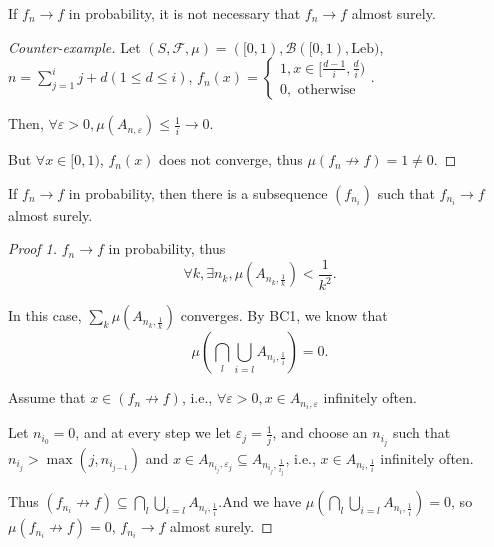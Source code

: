\begin{thm}{}{}
    If $f_n \to f$ in probability, it is not necessary that $f_n \to f$ almost surely.
\end{thm}
\begin{proof}[Counter-example]
    Let $(S, \mathcal F, \mu ) = ([0, 1), \mathcal B([0, 1), \text{Leb})$, $n = \sum _{j=1}^i j + d(1 \le d \le i)$,
    \begin{math}
        f_n(x) = \begin{cases}
            1, x \in [\frac{d-1}{i}, \frac{d}{i})\\
            0, \text{ otherwise }
        \end{cases}
    .\end{math}

    Then, $\forall \varepsilon >0, \mu (A_{n, \varepsilon }) \le \frac{1}{i} \to 0$. 

    But $\forall x \in [0, 1)$, $f_n(x)$ does not converge, thus $\mu (f_n \not\to f) = 1 \neq 0$.
\end{proof}

\begin{thm}{}{}
    If $f_n \to f$ in probability, then there is a subsequence $(f_{n_i})$ such that $f_{n_i} \to f$ almost surely.
\end{thm}

\begin{proof}[Proof 1]
    $f_n \to f$ in probability, thus
    $$\forall k, \exists n_k, \mu(A_{n_k, \frac{1}{k}}) < \frac{1}{k^2} .$$

    In this case, $\sum _k \mu(A_{n_k, \frac{1}{k}})$ converges. By BC1, we know that
    $$\mu(\bigcap_{l}\bigcup_{i=l} A_{n_i, \frac{1}{i}}) = 0.$$

    Assume that $x \in (f_n \not\to f)$, i.e., $\forall \varepsilon >0, x \in A_{n_i, \varepsilon }$ infinitely often. 

    Let $n_{i_0} = 0$, and at every step we let $\varepsilon _j = \frac{1}{j}$, and choose an $n_{i_j}$ such that $n_{i_j} > \max(j, n_{i_{j-1}})$ and $x \in A_{n_{i_j}, \varepsilon _j} \subseteq A_{n_{i_j}, \frac{1}{i_j}}$, i.e., $x \in A_{n_i, \frac{1}{i}}$ infinitely often.

    Thus $(f_{n_i} \not\to f) \subseteq \bigcap_{l}\bigcup_{i=l} A_{n_i, \frac{1}{i}} $.And we have $\mu(\bigcap_{l} \bigcup_{i=l} A_{n_i, \frac{1}{i}}) = 0$, so $\mu(f_{n_i} \not \to f) = 0$, $f_{n_i} \to f$ almost surely.

\end{proof}

